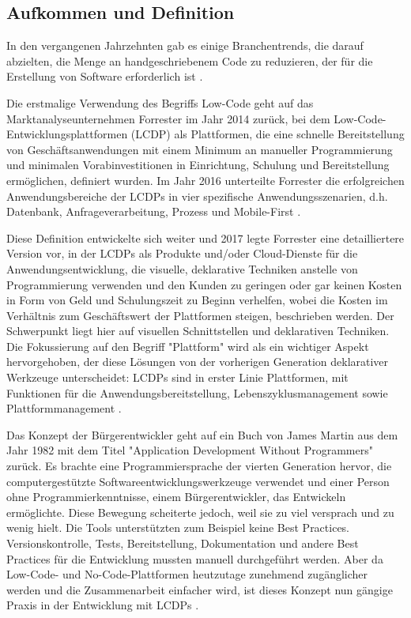 \documentclass[12pt]{article} %
\begin{document}
	\subsection{Aufkommen und Definition}		
	In den vergangenen Jahrzehnten gab es einige Branchentrends, die darauf abzielten, die Menge an handgeschriebenem Code zu reduzieren, der für die Erstellung von Software erforderlich ist \autocite{DiRuscio.2022}. \newline
	
	Die erstmalige Verwendung des Begriffs Low-Code geht auf das Marktanalyseunternehmen Forrester im Jahr 2014 zurück, bei dem Low-Code-Entwicklungsplattformen (LCDP) als Plattformen, die eine schnelle Bereitstellung von Geschäftsanwendungen mit einem Minimum an manueller Programmierung und minimalen Vorabinvestitionen in Einrichtung, Schulung und Bereitstellung ermöglichen, definiert wurden. 
	Im Jahr 2016 unterteilte Forrester die erfolgreichen Anwendungsbereiche der LCDPs in vier spezifische Anwendungsszenarien, d.h. Datenbank, Anfrageverarbeitung, Prozess und Mobile-First \autocite{DiRuscio.2022}. \newline 
	
	Diese Definition entwickelte sich weiter und 2017 legte Forrester eine detailliertere Version vor, in der LCDPs als Produkte und/oder Cloud-Dienste für die Anwendungsentwicklung, die visuelle, deklarative Techniken anstelle von Programmierung verwenden und den Kunden zu geringen oder gar keinen Kosten in Form von Geld und Schulungszeit zu Beginn verhelfen, wobei die Kosten im Verhältnis zum Geschäftswert der Plattformen steigen, beschrieben werden. 
	Der Schwerpunkt liegt hier auf visuellen Schnittstellen und deklarativen Techniken. Die Fokussierung auf den Begriff "Plattform" wird als ein wichtiger Aspekt hervorgehoben, der diese Lösungen von der vorherigen Generation deklarativer Werkzeuge unterscheidet: LCDPs sind in erster Linie Plattformen, mit Funktionen für die Anwendungsbereitstellung, Lebenszyklusmanagement sowie Plattformmanagement \autocite{DiRuscio.2022}. \newline
	
	Das Konzept der Bürgerentwickler geht auf ein Buch von James Martin aus dem Jahr 1982 mit dem Titel "Application Development Without Programmers" zurück. Es brachte eine Programmiersprache der vierten Generation hervor, die computergestützte Softwareentwicklungswerkzeuge verwendet und einer Person ohne Programmierkenntnisse, einem Bürgerentwickler, das Entwickeln ermöglichte. Diese Bewegung scheiterte jedoch, weil sie zu viel versprach und zu wenig hielt. Die Tools unterstützten zum Beispiel keine Best Practices. Versionskontrolle, Tests, Bereitstellung, Dokumentation und andere Best Practices für die Entwicklung mussten manuell durchgeführt werden. Aber da Low-Code- und No-Code-Plattformen heutzutage zunehmend zugänglicher werden und die Zusammenarbeit einfacher wird, ist dieses Konzept nun gängige Praxis in der Entwicklung mit LCDPs \autocite{KevinShuler.2023}. \newline
	
\end{document}
